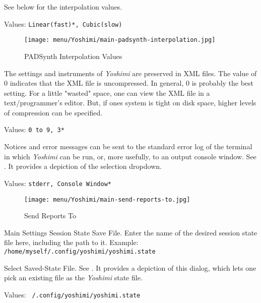    See  below
   for the interpolation values.

   Values: \texttt{Linear(fast)*, Cubic(slow)}

\begin{figure}[H]
   \centering 
   \texttt{[image: menu/Yoshimi/main-padsynth-interpolation.jpg]}
   \caption[PADSynth Interpolation]{PADSynth Interpolation Values}
   \label{fig:padsynth_interpolation}
\end{figure}

   The settings and instruments of
   \textsl{Yoshimi}
   are preserved in XML files.
   The value of 0 indicates that the XML file is uncompressed.
   In general, 0 is probably the best setting.  For a little "wasted"
   space, one can view the XML file in a text/programmer's editor.
   But, if ones system is tight on disk space, higher levels of compression
   can be specified.

   Values: \texttt{0 to 9, 3*}

   Notices and error messages can be sent to the standard error log of
   the terminal in which 
   \textsl{Yoshimi} can be run, or, more usefully, to
   an output console window.
   See .
   It provides a depiction of the selection dropdown.

   Values: \texttt{stderr, Console Window*}

\begin{figure}[H]
   \centering 
   \texttt{[image: menu/Yoshimi/main-send-reports-to.jpg]}
   \caption[Send Reports]{Send Reports To}
   \label{fig:send_reports_to}
\end{figure}

   Main Settings Session State Save File.
   Enter the name of the desired session state file here, including
   the path to it.
   Example: \texttt{/home/myself/.config/yoshimi/yoshimi.state}

   Select Saved-State File.
   See .
   It provides a depiction of this dialog, which lets one pick an existing
   file as the \textsl{Yoshimi} state file.

   Values: \texttt{~/.config/yoshimi/yoshimi.state}

